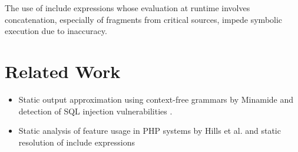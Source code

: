 \documentclass{sig-alternate-05-2015}
\begin{document}
\begin{framed}
\textcolor{RYB1}{The use of include expressions whose evaluation at runtime
involves concatenation, especially of fragments from critical sources, impede
symbolic execution due to inaccuracy.}
\end{framed}





\section{Related Work}
\begin{itemize}
  \item Static output approximation using context-free grammars
  by Minamide \cite{minamide2005static} and detection of SQL
  injection vulnerabilities \cite{wassermann2007sound}.
  \item Static analysis of feature usage in PHP systems by Hills et al.
  \cite{Hills:2013:ESP:2483760.2483786} and static resolution of include
  expressions \cite{Hills:2013:ESP:2483760.2483786,hills2014static}
\end{itemize}










\newpage

%
%
\end{document}
